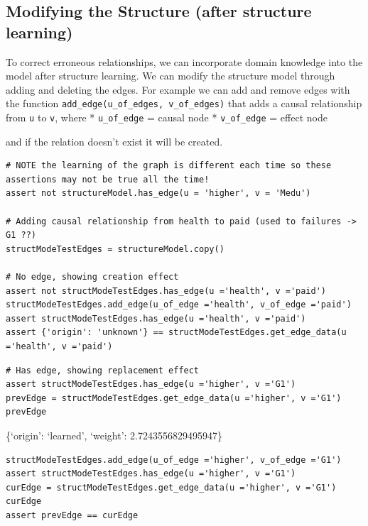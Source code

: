 \documentclass[
]{article}
\begin{document}
\hypertarget{modifying-the-structure-after-structure-learning}{%
\subsection{Modifying the Structure (after structure
learning)}\label{modifying-the-structure-after-structure-learning}}

To correct erroneous relationships, we can incorporate domain knowledge
into the model after structure learning. We can modify the structure
model through adding and deleting the edges. For example we can add and
remove edges with the function
\texttt{add_edge(u_of_edges, v_of_edges)} that adds a
causal relationship from \texttt{u} to
\texttt{v}, where * \texttt{u_of_edge} =
causal node * \texttt{v_of_edge} = effect node

and if the relation doesn't exist it will be created.

\begin{verbatim}
# NOTE the learning of the graph is different each time so these assertions may not be true all the time!
assert not structureModel.has_edge(u = 'higher', v = 'Medu')

# Adding causal relationship from health to paid (used to failures -> G1 ??)
structModeTestEdges = structureModel.copy()

# No edge, showing creation effect
assert not structModeTestEdges.has_edge(u ='health', v ='paid')
structModeTestEdges.add_edge(u_of_edge ='health', v_of_edge ='paid')
assert structModeTestEdges.has_edge(u ='health', v ='paid')
assert {'origin': 'unknown'} == structModeTestEdges.get_edge_data(u ='health', v ='paid')
\end{verbatim}

\begin{verbatim}
# Has edge, showing replacement effect
assert structModeTestEdges.has_edge(u ='higher', v ='G1')
prevEdge = structModeTestEdges.get_edge_data(u ='higher', v ='G1')
prevEdge
\end{verbatim}

\{`origin': `learned', `weight': 2.7243556829495947\}

\begin{verbatim}
structModeTestEdges.add_edge(u_of_edge ='higher', v_of_edge ='G1')
assert structModeTestEdges.has_edge(u ='higher', v ='G1')
curEdge = structModeTestEdges.get_edge_data(u ='higher', v ='G1')
curEdge
assert prevEdge == curEdge
\end{verbatim}
\end{document}
